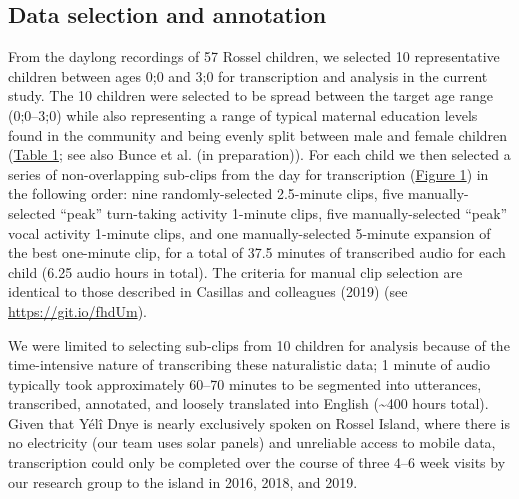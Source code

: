 \documentclass[,man,floatsintext]{apa6}
\begin{document}
\subsection{Data selection and annotation}\label{methods-samples}

From the daylong recordings of 57 Rossel children, we selected 10
representative children between ages 0;0 and 3;0 for transcription and
analysis in the current study. The 10 children were selected to be
spread between the target age range (0;0--3;0) while also representing a
range of typical maternal education levels found in the community and
being evenly split between male and female children
(\protect\hyperlink{tab1}{Table 1}; see also Bunce et al. (in
preparation)). For each child we then selected a series of
non-overlapping sub-clips from the day for transcription
(\protect\hyperlink{fig1}{Figure 1}) in the following order: nine
randomly-selected 2.5-minute clips, five manually-selected
\enquote{peak} turn-taking activity 1-minute clips, five
manually-selected \enquote{peak} vocal activity 1-minute clips, and one
manually-selected 5-minute expansion of the best one-minute clip, for a
total of 37.5 minutes of transcribed audio for each child (6.25 audio
hours in total). The criteria for manual clip selection are identical to
those described in Casillas and colleagues (2019) (see
\url{https://git.io/fhdUm}).

We were limited to selecting sub-clips from 10 children for analysis
because of the time-intensive nature of transcribing these naturalistic
data; 1 minute of audio typically took approximately 60--70 minutes to
be segmented into utterances, transcribed, annotated, and loosely
translated into English (\textasciitilde{}400 hours total). Given that
Yélî Dnye is nearly exclusively spoken on Rossel Island, where there is
no electricity (our team uses solar panels) and unreliable access to
mobile data, transcription could only be completed over the course of
three 4--6 week visits by our research group to the island in 2016,
2018, and 2019.
\end{document}

